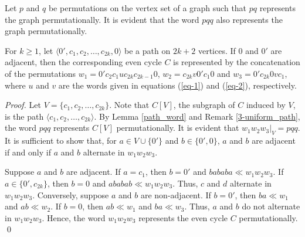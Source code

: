 \documentclass{llncs}
\begin{document}
\begin{remark}\label{3-uniform_path}
	Let $p$ and $q$ be permutations on the vertex set of a graph such that $pq$ represents the graph permutationally. It is evident that the word $pqq$ also represents the graph permutationally.
\end{remark}


\begin{lemma}\label{even_cycle_word}
	For $k \ge 1$, let $\langle 0', c_1, c_2, \ldots, c_{2k}, 0 \rangle$ be a path on $2k+2$ vertices. If $0$ and $0'$ are adjacent, then the corresponding even cycle $C$ is  represented by the concatenation of the permutations $w_1 = 0' c_2 c_1 uc_{2k} c_{2k-1} 0$, $w_2 = c_{2k} v 0' c_1 0$ and $w_3 = 0' c_{2k} 0 v c_1$, where $u$ and $v$ are the words given in equations (\ref{eq-1}) and (\ref{eq-2}), respectively.
\end{lemma}

\begin{proof}
	Let $V = \{c_1,c_2,\ldots, c_{2k}\}$. Note that $C[V]$, the subgraph of $C$ induced by $V$, is the path $\langle c_1, c_2, \ldots, c_{2k} \rangle$. By Lemma \ref{path_word} and Remark \ref{3-uniform_path}, the word $pqq$ represents $C[V]$ permutationally.  It is evident that $w_1w_2w_3 |_{V} = pqq$.  It is sufficient to show that, for $a \in V \cup \{0'\}$ and $b \in \{0', 0\}$, $a$ and $b$ are adjacent if and only if $a$ and $b$ alternate in $w_1w_2w_3$. 
	
	Suppose $a$ and $b$ are adjacent. If $a = c_1$, then $b = 0'$ and $bababa \ll w_1w_2w_3$. If $a \in \{0', c_{2k}\}$, then $b = 0$ and $ababab \ll w_1w_2w_3$. Thus, $c$ and $d$ alternate in $w_1w_2w_3$.
	Conversely, suppose $a$ and $b$ are non-adjacent. If $b = 0'$, then $ba \ll w_1$ and $ab \ll w_2$. If $b = 0$, then $ab \ll w_1$ and $ba \ll w_3$. 
	Thus, $a$ and $b$ do  not alternate in $w_1w_2w_3$. Hence, the word $w_1w_2w_3$ represents the even cycle $C$ permutationally.	\qed
\end{proof}
\end{document}
